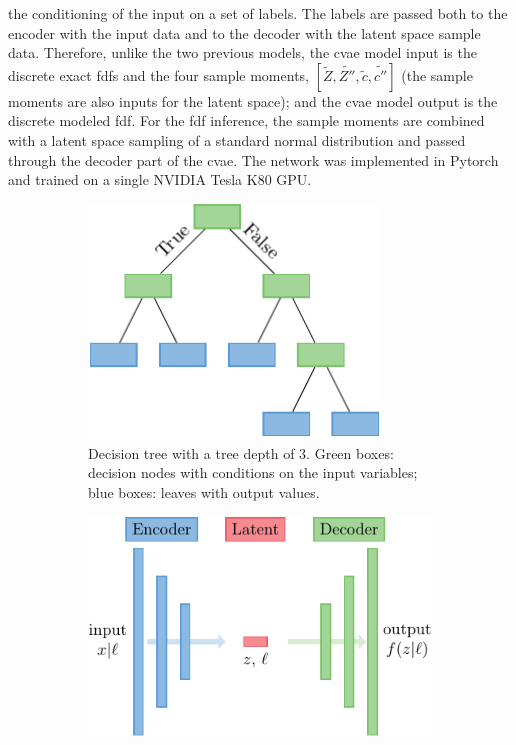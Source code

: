 \documentclass[review]{elsarticle}
\newcommand{\wt}[1]{\widetilde{#1}}
\begin{document}
the conditioning of the input on a set of labels. The labels are
passed both to the encoder with the input data and to the decoder with
the latent space sample data. Therefore, unlike the two previous
models, the \gls{cvae} model input is the discrete exact \glspl{fdf}
and the four sample moments,
$\left[ \wt{Z}, \wt{Z''}, \wt{c}, \wt{c''} \right]$ (the sample
moments are also inputs for the latent space); and the \gls{cvae}
model output is the discrete modeled \gls{fdf}. For the \gls{fdf}
inference, the sample moments are combined with a latent space
sampling of a standard normal distribution and passed through the
decoder part of the \gls{cvae}. The network was implemented in
Pytorch~\cite{Paszke2017} and trained on a single NVIDIA Tesla K80
GPU.

\begin{figure}[!tbp]%
  \centering%
  \begin{subfigure}[t]{0.48\textwidth}%
    \centering
    \includegraphics[width=0.85\textwidth]{./figs/rf.pdf}%
    \caption{Decision tree with a tree depth of 3. Green boxes: decision nodes with conditions on the input variables; blue boxes: leaves with output values.}\label{fig:rf}%
  \end{subfigure}\hfill%
  \begin{subfigure}[t]{0.48\textwidth}%
    \centering
    \includegraphics[width=\textwidth]{./figs/cvae.pdf}%

\end{subfigure}
\end{figure}
\end{document}
